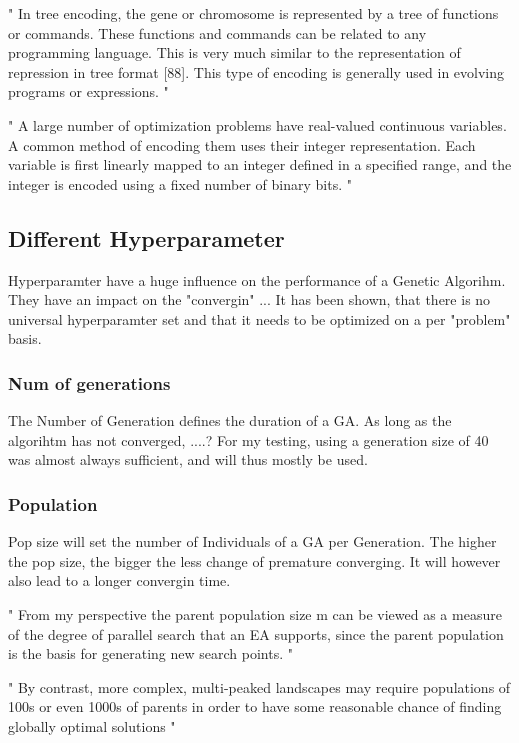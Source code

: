 "
In tree encoding, the gene or chromosome is represented by a tree of functions or commands. These functions and commands can be related to any programming language. This is very much similar to the representation of repression in tree format [88]. This type of encoding is generally used in evolving programs or expressions.
"\cite{katoch_review_2021}

"
A large number of optimization problems have real-valued continuous variables. A common method of encoding them uses their integer representation. Each variable is first linearly mapped to an integer defined in a specified range, and the integer is encoded using a fixed number of binary bits.
"\cite{srinivas_genetic_1994}

\subsection{Different Hyperparameter}
Hyperparamter have a huge influence on the performance of a Genetic Algorihm. They have an impact on the "convergin" ...
It has been shown, that there is no universal hyperparamter set and that it needs to be optimized on a per "problem" basis.

\subsubsection{Num of generations}
The Number of Generation defines the duration of a GA. As long as the algorihtm has not converged, ....?
For my testing, using a generation size of 40 was almost always sufficient, and will thus mostly be used.

\subsubsection{Population}
Pop size will set the number of Individuals of a GA per Generation. The higher the pop size, the bigger the less change of premature converging. 
It will however also lead to a longer convergin time.


"
From my perspective the parent population size m can be viewed as a measure of the degree of parallel search that an EA supports, since the parent population is the basis for generating new search points.
"\cite{kacprzyk_parameter_2007}

"
By contrast, more complex, multi-peaked landscapes may require populations of 100s or even 1000s of parents in order to have some reasonable chance of finding globally optimal solutions
"\cite{kacprzyk_parameter_2007}




